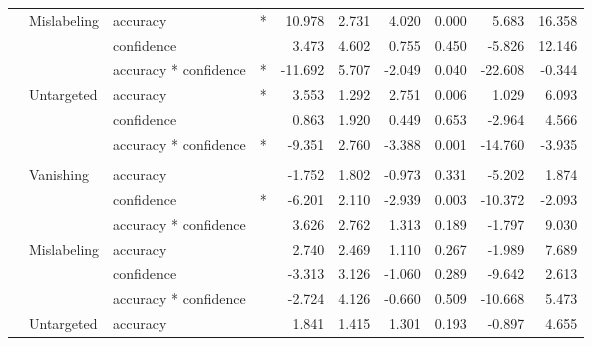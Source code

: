\documentclass[
]{article}
\begin{document}
\begin{longtable}[t]{llllrrrrrr}
\hspace{1em} & Mislabeling & accuracy & * & 10.978 & 2.731 & 4.020 & 0.000 & 5.683 & 16.358\\
\cmidrule{3-10}\nopagebreak
\hspace{1em} &  & confidence &  & 3.473 & 4.602 & 0.755 & 0.450 & -5.826 & 12.146\\
\cmidrule{3-10}\nopagebreak
\hspace{1em} &  & accuracy * confidence & * & -11.692 & 5.707 & -2.049 & 0.040 & -22.608 & -0.344\\
\cmidrule{2-10}\nopagebreak
\hspace{1em} & Untargeted & accuracy & * & 3.553 & 1.292 & 2.751 & 0.006 & 1.029 & 6.093\\
\cmidrule{3-10}\nopagebreak
\hspace{1em} &  & confidence &  & 0.863 & 1.920 & 0.449 & 0.653 & -2.964 & 4.566\\
\cmidrule{3-10}\nopagebreak
\hspace{1em} &  & accuracy * confidence & * & -9.351 & 2.760 & -3.388 & 0.001 & -14.760 & -3.935\\
\cmidrule{1-10}\pagebreak[0]
\addlinespace[0.3em]
\multicolumn{10}{l}{\textbf{Faster R-CNN}}\\
\hspace{1em} & Vanishing & accuracy &  & -1.752 & 1.802 & -0.973 & 0.331 & -5.202 & 1.874\\
\cmidrule{3-10}\nopagebreak
\hspace{1em} &  & confidence & * & -6.201 & 2.110 & -2.939 & 0.003 & -10.372 & -2.093\\
\cmidrule{3-10}\nopagebreak
\hspace{1em} &  & accuracy * confidence &  & 3.626 & 2.762 & 1.313 & 0.189 & -1.797 & 9.030\\
\cmidrule{2-10}\nopagebreak
\hspace{1em} & Mislabeling & accuracy &  & 2.740 & 2.469 & 1.110 & 0.267 & -1.989 & 7.689\\
\cmidrule{3-10}\nopagebreak
\hspace{1em} &  & confidence &  & -3.313 & 3.126 & -1.060 & 0.289 & -9.642 & 2.613\\
\cmidrule{3-10}\nopagebreak
\hspace{1em} &  & accuracy * confidence &  & -2.724 & 4.126 & -0.660 & 0.509 & -10.668 & 5.473\\
\cmidrule{2-10}\nopagebreak
\hspace{1em} & Untargeted & accuracy &  & 1.841 & 1.415 & 1.301 & 0.193 & -0.897 & 4.655\\

\end{longtable}
\end{document}
